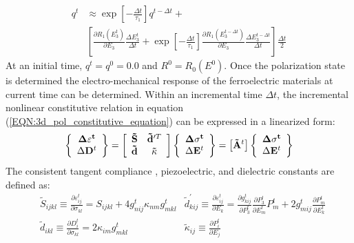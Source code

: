 \begin{equation}  
\begin{aligned} 
{q^t} & \approx \exp \left[ { - \frac{{\Delta t}}{{{\tau _1}}}} \right]{q^{t - \Delta t}} +\\
& \left[ {\frac{{\partial {R_1}(E_3^t)}}{{\partial {E_3}}}\frac{{\Delta E_3^t}}{{\Delta t}} + \exp \left[ { - \frac{{\Delta t}}{{{\tau _1}}}} \right]\frac{{\partial {R_1}(E_3^{t - \Delta t})}}{{\partial {E_3}}}\frac{{\Delta E_3^{t - \Delta t}}}{{\Delta t}}} \right]\frac{{\Delta t}}{2}
\end{aligned} 
\label{EQN:history_variable_}
\end{equation} 
At an initial time, ${q^t} = {q^0} = 0.0$ and  ${R^0} = {R_0}({E^0})$.
Once the polarization state is determined the electro-mechanical response of the ferroelectric materials at current time can be determined.
Within an incremental time $\Delta t$, the incremental nonlinear constitutive relation in equation (\ref{EQN:3d_pol_constitutive_equation}) can be expressed in a linearized form:
\begin{equation}   
\left\{ {\begin{array}{*{20}{c}}
\mathbf{\Delta {{\mathbf{\varepsilon }}^t}}\\
{\Delta {{\bf{D}}^t}}
\end{array}} \right\} = \left[ {\begin{array}{*{20}{c}}
{{\bf{\tilde S}}}&{{\bf{\tilde d}}{'^T}}\\
{{\bf{\tilde d}}}&{{\bf{\tilde \kappa }}}
\end{array}} \right]\left\{ {\begin{array}{*{20}{c}}
\mathbf{\Delta {{\bf{\sigma }}^t}}\\
{\Delta {{\bf{E}}^t}}
\end{array}} \right\} = \left[ {{{{\bf{\tilde A}}}^t}} \right]\left\{ {\begin{array}{*{20}{c}}
\mathbf{\Delta {{\mathbf{\sigma }}^t}}\\
{\Delta {{\bf{E}}^t}}
\end{array}} \right\}
\label{EQN:linearized_polarization_const_eqn}
\end{equation} 
The consistent tangent compliance , piezoelectric, and dielectric constants are defined as:
\begin{equation}  
\begin{aligned} 
& {{\tilde S}_{ijkl}} \equiv \frac{{\partial \varepsilon _{ij}^t}}{{\partial {\sigma _{kl}}}} = {S_{ijkl}} + 4g_{nij}^t{\kappa _{nm}}g_{mkl}^t  & \tilde d_{kij}^{'} \equiv \frac{{\partial \varepsilon _{ij}^t}}{{\partial {E_k}}} = \frac{{\partial g_{kij}^t}}{{\partial P_3^t}}\frac{{\partial P_3^t}}{{\partial E_m^t}}P_m^t + 2 g_{mij}^t\frac{{\partial P_m^t}}{{\partial E_k^t}}\\
& {{\tilde d}_{ikl}} \equiv \frac{{\partial D_i^t}}{{\partial {\sigma _{kl}}}} = 2{\kappa _{im}}g_{mkl}^t & {{\tilde \kappa }_{ij}} \equiv \frac{{\partial P_i^t}}{{\partial {E_j}}} \\
\end{aligned} 
\label{EQN:linearized_polarization_const_derivative}
\end{equation}  
